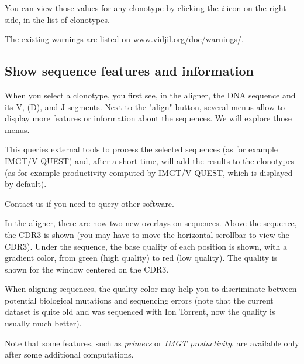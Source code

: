 You can view those values for any clonotype by clicking the \textit{i} icon on the
right side, in the list of clonotypes.

The existing warnings are listed on \href{https://www.vidjil.org/doc/warnings/}{www.vidjil.org/doc/warnings/}.

\subsection{Show sequence features and information}

When you select a clonotype, you first see, in the aligner, the DNA sequence and its V, (D), and J segments.
Next to the "align" button, several menus allow to display more features or information about the sequences. We will explore those menus.
 


This queries external tools to process the selected sequences (as for example IMGT/V-QUEST)
and, after a short time, will add the results to the clonotypes (as for example productivity computed by IMGT/V-QUEST, which is displayed by default).

Contact us if you need to query other software.



In the aligner, there are now two new overlays on sequences. 
Above the sequence, the CDR3 is shown (you may have to move the horizontal scrollbar to view the CDR3).
Under the sequence, the base quality of each position is shown, with a gradient color, from green (high quality) to red (low quality). The quality is shown for the window centered on the CDR3.

When aligning sequences, the quality color may help you to discriminate between potential biological mutations and sequencing errors (note that the current dataset is quite old and was sequenced with Ion Torrent, now the quality is usually much better).


Note that some features, such as \textit{primers} or \textit{IMGT productivity}, are available only after some additional computations.



